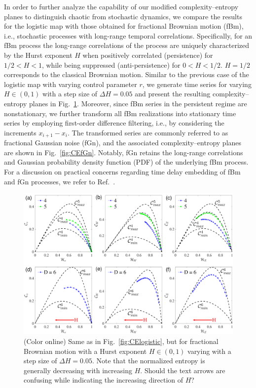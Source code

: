 \documentclass[12pt,aip,cha,reprint,nofootinbib]{revtex4-1}
\begin{document}
In order to further analyze the capability of our modified complexity--entropy planes to distinguish chaotic from stochastic dynamics, we compare the results for the logistic map with those obtained for fractional Brownian motion (fBm), i.e., stochastic processes with long-range temporal correlations. Specifically, for an fBm process the long-range correlations of the process are uniquely characterized by the Hurst exponent $H$ when positively correlated (persistence) for $1/2 < H < 1$, while being suppressed (anti-persistence) for $0< H < 1/2$. $H=1/2$ corresponds to the classical Brownian motion. Similar to the previous case of the logistic map with varying control parameter $r$, we generate time series for varying $H \in (0, 1)$ with a step size of $\Delta H=0.05$ and present the resulting complexity--entropy planes in Fig.~\ref{fig:CEfBm}. Moreover, since fBm series in the persistent regime are nonstationary, we further transform all fBm realizations into stationary time series by employing first-order difference filtering, i.e., by considering the increments $x_{i+1}- x_i$. The transformed series are commonly referred to as fractional Gaussian noise (fGn), and the associated complexity--entropy planes are shown in Fig.~\ref{fig:CEfGn}. Notably, fGn retains the long-range correlations and Gaussian probability density function (PDF) of the underlying fBm process. For a discussion on practical concerns regarding time delay embedding of fBm and fGn processes, we refer to Ref.~\cite{Zou2015}. 

\begin{figure}
	\centering 
	\includegraphics[width=2\columnwidth]{CompEntropy_fBm.pdf}
\caption{\small{(Color online) Same as in Fig.~\ref{fig:CElogistic}, but for fractional Brownian motion with a Hurst exponent $H \in (0, 1)$ varying with a step size of $\Delta H=0.05$. Note that the normalized entropy is generally decreasing with increasing $H$. {\color{red} Should the text arrows are confusing while indicating the increasing direction of $H$? }}  \label{fig:CEfBm}}
\end{figure}
\end{document}

